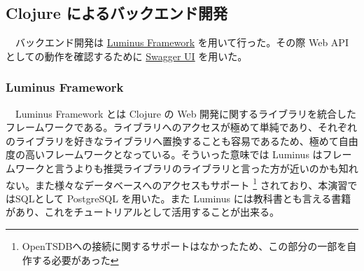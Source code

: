 \documentclass{scrartcl}
\begin{document}
\subsection{Clojure によるバックエンド開発}
\label{sec:orgb7533b6}
　バックエンド開発は \href{http://www.luminusweb.net/}{Luminus Framework} を用いて行った。その際 Web API としての動作を確認するために \href{https://swagger.io/swagger-ui/}{Swagger UI} を用いた。\\
\subsubsection{Luminus Framework}
\label{sec:orgdeb0a41}
　Luminus Framework とは Clojure の Web 開発に関するライブラリを統合したフレームワークである。ライブラリへのアクセスが極めて単純であり、それぞれのライブラリを好きなライブラリへ置換することも容易であるため、極めて自由度の高いフレームワークとなっている。そういった意味では Luminus はフレームワークと言うよりも推奨ライブラリのライブラリと言った方が近いのかも知れない。また様々なデータベースへのアクセスもサポート \footnote{OpenTSDBへの接続に関するサポートはなかったため、この部分の一部を自作する必要があった} されており、本演習ではSQLとして PostgreSQL を用いた。また Luminus には教科書とも言える書籍 \cite{luminus} があり、これをチュートリアルとして活用することが出来る。\\
\end{document}
